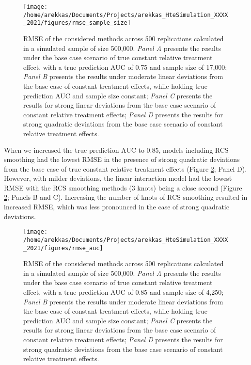 \documentclass{article}
\begin{document}
\begin{figure}
\texttt{[image: /home/arekkas/Documents/Projects/arekkas\_HteSimulation\_XXXX\_2021/figures/rmse\_sample\_size]} \caption{RMSE of the considered methods across 500 replications calculated in a simulated sample of size 500,000. \textit{Panel A} presents the results under the base case scenario of true constant relative treatment effect, with a true prediction AUC of 0.75 and sample size of 17,000; \textit{Panel B} presents the results under moderate linear deviations from the base case of constant treatment effects, while holding true prediction AUC and sample size constant; \textit{Panel C} presents the results for strong linear deviations from the base case scenario of constant relative treatment effects; \textit{Panel D} presents the results for strong quadratic deviations from the base case scenario of constant relative treatment effects.}\label{fig:rmsesamplesize}
\end{figure}

When we increased the true prediction AUC to 0.85, models including RCS
smoothing had the lowest RMSE in the presence of strong quadratic
deviations from the base case of true constant relative treatment
effects (Figure \ref{fig:rmseauc}; Panel D). However, with milder
deviations, the linear interaction model had the lowest RMSE with the
RCS smoothing methods (3 knots) being a close second (Figure
\ref{fig:rmseauc}; Panels B and C). Increasing the number of knots of
RCS smoothing resulted in increased RMSE, which was less pronounced in
the case of strong quadratic deviations.

\begin{figure}
\texttt{[image: /home/arekkas/Documents/Projects/arekkas\_HteSimulation\_XXXX\_2021/figures/rmse\_auc]} \caption{RMSE of the considered methods across 500 replications calculated in a simulated sample of size 500,000. \textit{Panel A} presents the results under the base case scenario of true constant relative treatment effect, with a true prediction AUC of 0.85 and sample size of 4,250; \textit{Panel B} presents the results under moderate linear deviations from the base case of constant treatment effects, while holding true prediction AUC and sample size constant; \textit{Panel C} presents the results for strong linear deviations from the base case scenario of constant relative treatment effects; \textit{Panel D} presents the results for strong quadratic deviations from the base case scenario of constant relative treatment effects.}\label{fig:rmseauc}
\end{figure}
\end{document}
